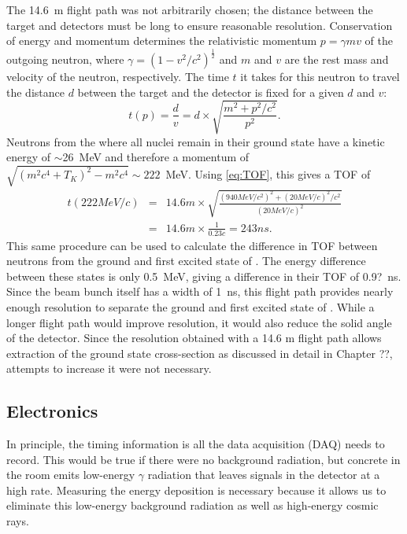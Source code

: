 The 14.6~m flight path was not arbitrarily chosen; the distance between the target and detectors must be long to ensure reasonable resolution.  Conservation of energy and momentum determines the relativistic momentum $p = \gamma m v$ of the outgoing neutron, where $\gamma=(1-v^2/c^2)^{\frac{1}{2}}$ and $m$ and $v$ are the rest mass and velocity of the neutron, respectively.  The time $t$ it takes for this neutron to travel the distance $d$ between the target and the detector is fixed for a given $d$ and $v$:
\begin{equation}
t(p) = \frac{d}{v} =  d\times\sqrt{\frac{m^2+p^2/c^2}{p^2}}. 
\label{eq:TOF}
\end{equation}
Neutrons from the \reaction where all nuclei remain in their ground state have a kinetic energy of $\sim$26~MeV and therefore a momentum of $\sqrt{(m^2c^4+T_K)^2-m^2c^4}\sim222$~MeV.  Using \eqn \ref{eq:TOF}, this gives a TOF of
\begin{eqnarray}
t(222 MeV/c) &=& 14.6 m\times\sqrt{\frac{(940 MeV/c^2)^2+(20 MeV/c)^2/c^2}{(20 MeV/c)^2}} \nonumber \\
           &=& 14.6 m\times\frac{1}{0.23 c} = 243 ns \nonumber.
\end{eqnarray}
This same procedure can be used to calculate the difference in TOF between neutrons from the ground and first excited state of .  The energy difference between these states is only 0.5~MeV, giving a difference in their TOF of 0.9?~ns.  Since the beam bunch itself has a width of 1~ns, this flight path provides nearly enough resolution to separate the ground and first excited state of \GeTargets. While a longer flight path would improve resolution, it would also reduce the solid angle of the detector.  Since the resolution obtained with a 14.6 m flight path allows extraction of the ground state cross-section as discussed in detail in Chapter ??, attempts to increase it were not necessary.


\subsection{Electronics}
\label{sec:electronics}

In principle, the timing information is all the data acquisition (DAQ) needs to record.  This would be true if there were no background radiation, but concrete in the room emits low-energy $\gamma$ radiation that leaves signals in the detector at a high rate.  Measuring the energy deposition is necessary because it allows us to eliminate this low-energy background radiation as well as high-energy cosmic rays.

